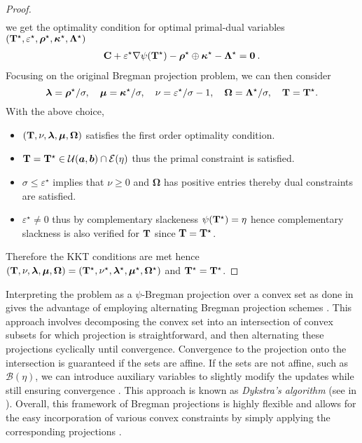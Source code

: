 \begin{proof}
\begin{align}
    \end{align}
    we get the optimality condition for optimal primal-dual variables $({\mathbf{T}}^\star, \varepsilon^\star, \bm{\rho}^\star, \bm{\kappa}^\star, \mathbf{\Lambda}^\star)$
    \begin{align}
        \mathbf{C} + \varepsilon^\star \nabla \psi({\mathbf{T}}^\star) -  \bm{\rho}^\star \oplus \bm{\kappa}^{\star} - \mathbf{\Lambda}^\star = \bm{0} \:.
    \end{align}
    Focusing on the original Bregman projection problem, we can then consider
    \[
    \bm{\lambda} = \bm{\rho}^\star / \sigma, \quad \bm{\mu} = \bm{\kappa}^\star / \sigma, \quad \nu = \varepsilon^\star / \sigma - 1, \quad \mathbf{\Omega} = \mathbf{\Lambda}^\star / \sigma, \quad {\mathbf{T}} = {\mathbf{T}}^\star.
    \]
    With the above choice, 
    \begin{itemize}
        \item  $({\mathbf{T}}, \nu, \bm{\lambda}, \bm{\mu}, \mathbf{\Omega})$ satisfies the first order optimality condition.
        \item ${\mathbf{T}} = {\mathbf{T}}^\star \in {\mathcal{U}}(\bm{a}, \bm{b}) \cap \mathcal{E}(\eta)$ thus the primal constraint is satisfied. 
        \item $\sigma \leq \varepsilon^\star$ implies that $\nu \geq 0$ and $\mathbf{\Omega}$ has positive entries thereby dual constraints are satisfied. 
        \item $\varepsilon^\star \neq 0$ thus by complementary slackeness $\psi({\mathbf{T}}^\star) = \eta$ hence complementary slackness is also verified for ${\mathbf{T}}$ since ${\mathbf{T}} = {\mathbf{T}}^\star$.
    \end{itemize}
    Therefore the KKT conditions are met hence $({\mathbf{T}}, \nu, \bm{\lambda}, \bm{\mu}, \mathbf{\Omega}) = ({\mathbf{T}}^\star, \nu^\star, \bm{\lambda}^\star, \bm{\mu}^\star, \mathbf{\Omega}^\star)$ and ${\mathbf{T}}^\star = {\mathbf{T}}^\star$.
\end{proof}

Interpreting the problem as a $\psi$-Bregman projection over a convex set as done in  gives the advantage of employing alternating Bregman projection schemes \citep{benamou2015iterative}. This approach involves decomposing the convex set into an intersection of convex subsets for which projection is straightforward, and then alternating these projections cyclically until convergence. Convergence to the projection onto the intersection is guaranteed if the sets are affine. If the sets are not affine, such as $\mathcal{B}(\eta)$, we can introduce auxiliary variables to slightly modify the updates while still ensuring convergence \citep{censor1998dykstra}. This approach is known as \emph{Dykstra's algorithm} \citep{dykstra1983algorithm} (see \eg {} in ). Overall, this framework of Bregman projections is highly flexible and allows for the easy incorporation of various convex constraints by simply applying the corresponding projections \citep{benamou2015iterative}.

